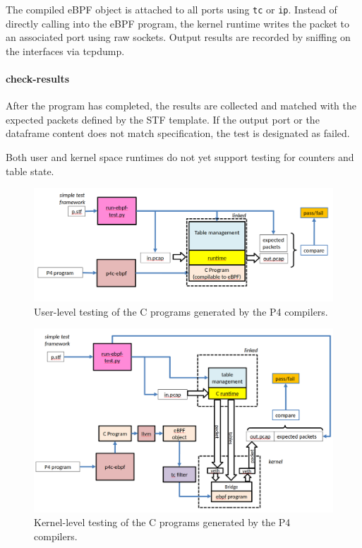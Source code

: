 The compiled eBPF object is attached to all ports using \texttt{tc} or 
\texttt{ip}. Instead of directly calling into the eBPF program, the kernel 
runtime writes the packet to an associated port using raw sockets. Output 
results are recorded by sniffing on the interfaces via tcpdump. 

\paragraph{check-results}
After the program has completed, the results are collected and matched with the 
expected packets defined by the STF template. If the output port or the 
dataframe content does not match specification, the test is designated as 
failed.

Both user and kernel space runtimes do not yet support testing for counters and 
table state.
\begin{figure}
	\centering
	\includegraphics[width=\linewidth]{user_test}
	\caption{User-level testing of the C programs generated by the P4 compilers.}
	\label{fig:user_test}
\end{figure}
\begin{figure}
	\centering
	\includegraphics[width=\linewidth]{kernel_test}
	\caption{Kernel-level testing of the C programs generated by the P4 
	compilers.}
	\label{fig:kernel_test}
\end{figure}
